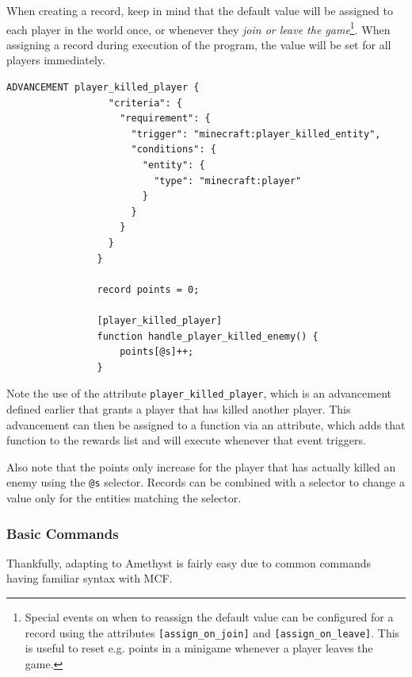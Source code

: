 \documentclass[12pt]{article}
\begin{document}
            When creating a record, keep in mind that the default value will be assigned to each player in the world once, or whenever they \textit{join or leave the game}\footnote{Special events on when to reassign the default value can be configured for a record using the attributes \lstinline{[assign_on_join]} and \lstinline{[assign_on_leave]}. This is useful to reset e.g. points in a minigame whenever a player leaves the game.}. When assigning a record during execution of the program, the value will be set for all players immediately.
            
            \label{fig:first_data_resource} \begin{lstlisting}[title=Increase points for a player that kills another player]
                ADVANCEMENT player_killed_player {
                  "criteria": {
                    "requirement": {
                      "trigger": "minecraft:player_killed_entity",
                      "conditions": {
                        "entity": {
                          "type": "minecraft:player"
                        }
                      }
                    }
                  }
                }
            
                record points = 0;
                
                [player_killed_player]
                function handle_player_killed_enemy() {
                    points[@s]++;
                }
            \end{lstlisting}
            
            Note the use of the attribute \lstinline{player_killed_player}, which is an advancement defined earlier that grants a player that has killed another player. This advancement can then be assigned to a function via an attribute, which adds that function to the rewards list and will execute whenever that event triggers.
            
            Also note that the points only increase for the player that has actually killed an enemy using the \lstinline{@s} selector. Records can be combined with a selector to change a value only for the entities matching the selector.
            
        \subsubsection{Basic Commands}
            Thankfully, adapting to Amethyst is fairly easy due to common commands having familiar syntax with MCF.
            
\end{document}
